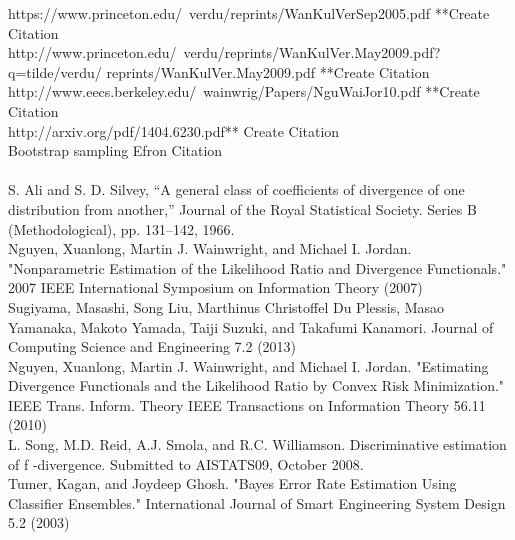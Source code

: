 \documentclass{article}
\begin{document}
	\noindent [11] https://www.princeton.edu/~verdu/reprints/WanKulVerSep2005.pdf **Create Citation
	\\ [0.5ex]
	\noindent [12] http://www.princeton.edu/~verdu/reprints/WanKulVer.May2009.pdf?q=tilde/verdu/
	reprints/WanKulVer.May2009.pdf **Create Citation
	\\ [0.5ex]
	
	\noindent [13] http://www.eecs.berkeley.edu/~wainwrig/Papers/NguWaiJor10.pdf **Create Citation
	\\ [0.5ex]
	

	
	\noindent [16] http://arxiv.org/pdf/1404.6230.pdf** Create Citation
	\\ [0.5ex]
	
	\noindent [17] Bootstrap sampling Efron Citation
	\\ [0.5ex]
	
	\noindent [18]
	\\ [0.5ex]
	
	\noindent [19]S. Ali and S. D. Silvey, “A general class of coefficients of divergence of one distribution from another,” Journal of the Royal Statistical Society.
	Series B (Methodological), pp. 131–142, 1966.
	\\ [0.5ex]
	
	\noindent [20] Nguyen, Xuanlong, Martin J. Wainwright, and Michael I. Jordan. "Nonparametric Estimation of the Likelihood Ratio and Divergence Functionals." 2007 IEEE International Symposium on Information Theory (2007)
	\\ [0.5ex]

	\noindent [21] Sugiyama, Masashi, Song Liu, Marthinus Christoffel Du Plessis, Masao Yamanaka, Makoto Yamada, Taiji Suzuki, and Takafumi Kanamori. Journal of Computing Science and Engineering 7.2 (2013)
	\\ [0.5ex]
	
	\noindent [22] Nguyen, Xuanlong, Martin J. Wainwright, and Michael I. Jordan. "Estimating Divergence Functionals and the Likelihood Ratio by Convex Risk Minimization." IEEE Trans. Inform. Theory IEEE Transactions on Information Theory 56.11 (2010)
	\\ [0.5ex]
	
	\noindent [23] L. Song, M.D. Reid, A.J. Smola, and R.C. Williamson. Discriminative estimation of f -divergence. Submitted to AISTATS09, October 2008.
	\\ [0.5ex]
	
	\noindent [24] Tumer, Kagan, and Joydeep Ghosh. "Bayes Error Rate Estimation Using Classifier Ensembles." International Journal of Smart Engineering System Design 5.2 (2003)
\end{document}

